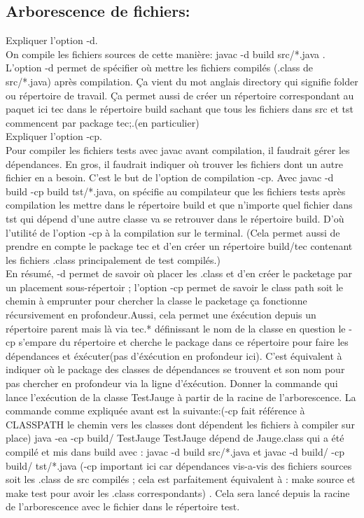 \documentclass{article}
\begin{document}
\subsection{Arborescence de fichiers: }
Expliquer l’option -d.\\
On compile les fichiers sources de cette manière: javac -d build src/*.java . L’option -d
permet de spécifier où mettre les fichiers compilés (.class de src/*.java) après compilation. Ça vient du mot anglais directory qui signifie folder ou répertoire de travail. Ça permet aussi de créer un répertoire correspondant au paquet ici tec dans le répertoire build sachant que tous les fichiers dans src et tst commencent par package tec;.(en particulier)
\\
Expliquer l’option -cp.\\
Pour compiler les fichiers tests avec javac avant compilation, il faudrait gérer les
dépendances. En gros, il faudrait indiquer où trouver les fichiers dont un autre fichier en a besoin. C’est le but de l’option de compilation -cp. Avec javac -d build -cp build tst/*.java, on spécifie au compilateur que les fichiers tests après compilation les mettre dans le répertoire build et que n’importe quel fichier dans tst qui dépend d’une autre classe va se retrouver dans le répertoire build. D’où l’utilité de l’option -cp à la compilation sur le terminal. (Cela permet aussi de prendre en compte le package tec et d’en créer un répertoire build/tec contenant les fichiers .class principalement de test compilés.)\\
En résumé, -d permet de savoir où placer les .class et d'en créer le packetage par un placement sous-répertoir ; l'option -cp permet de savoir le class path soit le chemin à emprunter pour chercher la classe le packetage ça fonctionne récursivement en profondeur.Aussi, cela permet une éxécution depuis un répertoire parent mais là via tec.* définissant le nom de la classe en question le -cp s'empare du répertoire et cherche le package dans ce répertoire pour faire les dépendances et éxécuter(pas d'éxécution en profondeur ici). C'est équivalent à indiquer où le package des classes de dépendances se trouvent et son nom pour pas chercher en profondeur via la ligne d'éxécution.
\newline
Donner la commande qui lance l’exécution de la classe TestJauge à partir de la racine de
l’arborescence. La commande comme expliquée avant est la suivante:(-cp fait référence à CLASSPATH le chemin vers les classes dont dépendent les fichiers à compiler sur place)
java -ea -cp build/ TestJauge TestJauge dépend de Jauge.class qui a été compilé et mis dans build avec : javac -d build src/*.java et javac -d build/ -cp build/ tst/*.java (-cp important ici car dépendances vis-a-vis des fichiers sources soit les .class de src compilés ; cela est parfaitement équivalent à : make source et make test pour avoir les .class correspondants) . Cela sera lancé depuis la racine de l’arborescence avec le fichier dans le répertoire test.\\
\newline
\end{document}

